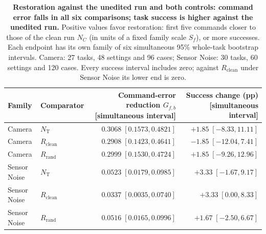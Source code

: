 \begin{table}[t]
\caption{\textbf{Restoration against the unedited run and both controls: command error falls in all six comparisons; task success is higher against the unedited run.} Positive values favor restoration: first five commands closer to those of the clean run $N_C$ (in units of a fixed family scale $S_f$), or more successes. Each endpoint has its own family of six simultaneous 95\% whole-task bootstrap intervals. Camera: 27 tasks, 48 settings and 96 cases; Sensor Noise: 30 tasks, 60 settings and 120 cases. Every success interval includes zero; against $R_{\mathrm{clean}}$ under Sensor Noise its lower end is zero.}

\centering\small
\setlength{\tabcolsep}{7pt}
\begin{tabular}{@{}llrr@{}}
\toprule
Family & Comparator & Command-error reduction $G_{f,b}$ [simultaneous interval] & Success change (pp) [simultaneous interval]\\
\midrule
Camera & $N_{\mathrm{T}}$ & $0.3068\;[0.1573,0.4821]$ & $+1.85\;[-8.33,11.11]$\\
Camera & $R_{\mathrm{clean}}$ & $0.2908\;[0.1423,0.4641]$ & $-1.85\;[-12.04,7.41]$\\
Camera & $R_{\mathrm{rand}}$ & $0.2999\;[0.1530,0.4724]$ & $+1.85\;[-9.26,12.96]$\\
\midrule
Sensor Noise & $N_{\mathrm{T}}$ & $0.0523\;[0.0179,0.0985]$ & $+3.33\;[-1.67,9.17]$\\
Sensor Noise & $R_{\mathrm{clean}}$ & $0.0337\;[0.0035,0.0740]$ & $+3.33\;[0.00,8.33]$\\
Sensor Noise & $R_{\mathrm{rand}}$ & $0.0516\;[0.0165,0.0996]$ & $+1.67\;[-2.50,6.67]$\\
\bottomrule
\end{tabular}

\label{tab:allstep-restoration-contrasts}
\end{table}
